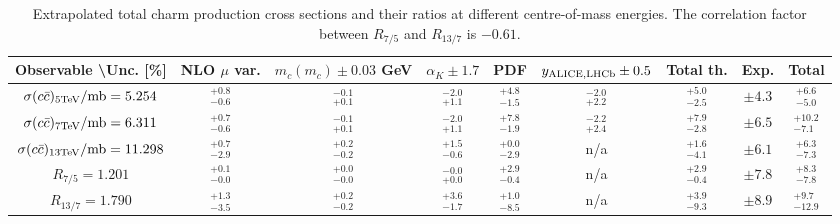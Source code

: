 \documentclass[12pt,a4paper]{article}
\begin{document}
\begin{landscape}
    \begin{table}
        \renewcommand{\arraystretch}{1.8}
        \begin{tabular}{|c||c|c|c|c|c|c||c||c|}
            \hline
            Observable \textbackslash Unc. [\%] &  NLO $\mu$ var. & $m_c(m_c) \pm 0.03$ GeV & $\alpha_{K} \pm 1.7$ & PDF &  $y_{\rm ALICE,LHCb} \pm 0.5$ &  Total th. &  Exp. &  Total \\ \hline 
            $\sigma(c\bar{c})_{\rm 5TeV}/{\rm mb} = 5.254$ & ${}^{+0.8}_{-0.6}$ & ${}^{-0.1}_{+0.1}$ & ${}^{-2.0}_{+1.1}$ & ${}^{+4.8}_{-1.5}$ & ${}^{-2.0}_{+2.2}$ & ${}^{+5.0}_{-2.5}$ & $\pm{4.3}$ & ${}^{+6.6}_{-5.0}$ \\ \hline 
            $\sigma(c\bar{c})_{\rm 7TeV}/{\rm mb} = 6.311$ & ${}^{+0.7}_{-0.6}$ & ${}^{-0.1}_{+0.1}$ & ${}^{-2.0}_{+1.1}$ & ${}^{+7.8}_{-1.9}$ & ${}^{-2.2}_{+2.4}$ & ${}^{+7.9}_{-2.8}$ & $\pm{6.5}$ & ${}^{+10.2}_{-7.1}$ \\ \hline 
            $\sigma(c\bar{c})_{\rm 13TeV}/{\rm mb} = 11.298$ & ${}^{+0.7}_{-2.9}$ & ${}^{+0.2}_{-0.2}$ & ${}^{+1.5}_{-0.6}$ & ${}^{+0.0}_{-2.9}$ & n/a & ${}^{+1.6}_{-4.1}$ & $\pm{6.1}$ & ${}^{+6.3}_{-7.3}$ \\ \hline 
            $R_{7/5} = 1.201$ & ${}^{+0.1}_{-0.0}$ & ${}^{+0.0}_{-0.0}$ & ${}^{-0.0}_{+0.0}$ & ${}^{+2.9}_{-0.4}$ & n/a & ${}^{+2.9}_{-0.4}$ & $\pm{7.8}$ & ${}^{+8.3}_{-7.8}$ \\ \hline 
            $R_{13/7} = 1.790$ & ${}^{+1.3}_{-3.5}$ & ${}^{+0.2}_{-0.2}$ & ${}^{+3.6}_{-1.7}$ & ${}^{+1.0}_{-8.5}$ & n/a & ${}^{+3.9}_{-9.3}$ & $\pm{8.9}$ & ${}^{+9.7}_{-12.9}$ \\ \hline 
        \end{tabular}
        \caption{Extrapolated total charm production cross sections and their ratios at different centre-of-mass energies. The correlation factor between $R_{7/5}$ and $R_{13/7}$ is $-0.61$.}
        \label{tab:extrap}
    \end{table}
\end{landscape}
\end{document}
